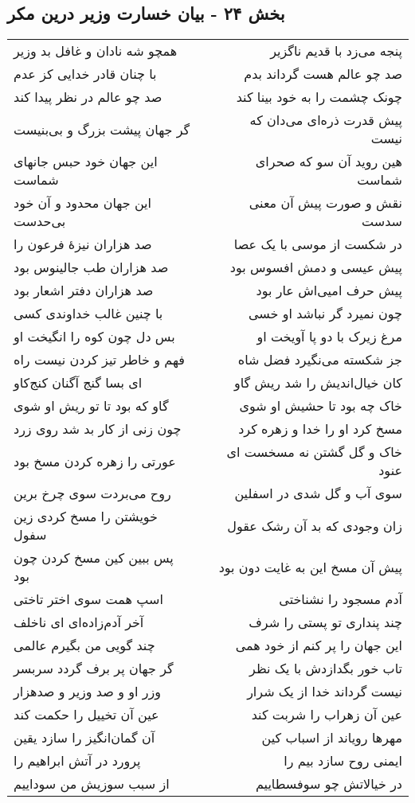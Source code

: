 \begin{center}
\section*{بخش ۲۴ - بیان خسارت وزیر درین مکر}
\label{sec:sh024}
\begin{longtable}{l p{0.5cm} r}
همچو شه نادان و غافل بد وزیر
&&
پنجه می‌زد با قدیم ناگزیر
\\
با چنان قادر خدایی کز عدم
&&
صد چو عالم هست گرداند بدم
\\
صد چو عالم در نظر پیدا کند
&&
چونک چشمت را به خود بینا کند
\\
گر جهان پیشت بزرگ و بی‌بنیست
&&
پیش قدرت ذره‌ای می‌دان که نیست
\\
این جهان خود حبس جانهای شماست
&&
هین روید آن سو که صحرای شماست
\\
این جهان محدود و آن خود بی‌حدست
&&
نقش و صورت پیش آن معنی سدست
\\
صد هزاران نیزهٔ فرعون را
&&
در شکست از موسی با یک عصا
\\
صد هزاران طب جالینوس بود
&&
پیش عیسی و دمش افسوس بود
\\
صد هزاران دفتر اشعار بود
&&
پیش حرف امیی‌اش عار بود
\\
با چنین غالب خداوندی کسی
&&
چون نمیرد گر نباشد او خسی
\\
بس دل چون کوه را انگیخت او
&&
مرغ زیرک با دو پا آویخت او
\\
فهم و خاطر تیز کردن نیست راه
&&
جز شکسته می‌نگیرد فضل شاه
\\
ای بسا گنج آگنان کنج‌کاو
&&
کان خیال‌اندیش را شد ریش گاو
\\
گاو که بود تا تو ریش او شوی
&&
خاک چه بود تا حشیش او شوی
\\
چون زنی از کار بد شد روی زرد
&&
مسخ کرد او را خدا و زهره کرد
\\
عورتی را زهره کردن مسخ بود
&&
خاک و گل گشتن نه مسخست ای عنود
\\
روح می‌بردت سوی چرخ برین
&&
سوی آب و گل شدی در اسفلین
\\
خویشتن را مسخ کردی زین سفول
&&
زان وجودی که بد آن رشک عقول
\\
پس ببین کین مسخ کردن چون بود
&&
پیش آن مسخ این به غایت دون بود
\\
اسپ همت سوی اختر تاختی
&&
آدم مسجود را نشناختی
\\
آخر آدم‌زاده‌ای ای ناخلف
&&
چند پنداری تو پستی را شرف
\\
چند گویی من بگیرم عالمی
&&
این جهان را پر کنم از خود همی
\\
گر جهان پر برف گردد سربسر
&&
تاب خور بگدازدش با یک نظر
\\
وزر او و صد وزیر و صدهزار
&&
نیست گرداند خدا از یک شرار
\\
عین آن تخییل را حکمت کند
&&
عین آن زهراب را شربت کند
\\
آن گمان‌انگیز را سازد یقین
&&
مهرها رویاند از اسباب کین
\\
پرورد در آتش ابراهیم را
&&
ایمنی روح سازد بیم را
\\
از سبب سوزیش من سوداییم
&&
در خیالاتش چو سوفسطاییم
\\
\end{longtable}
\end{center}

